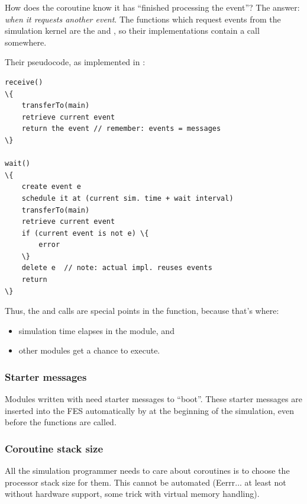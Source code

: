 How does the coroutine know it has ``finished processing the event''?
The answer: \textit{when it requests another event}.  The functions
which request events from the simulation kernel are the
 and , so their
implementations contain a  call
somewhere.


Their pseudocode, as implemented in {\opp}:


\begin{Verbatim}[commandchars=\\\{\}]
receive()
\{
    transferTo(main)
    retrieve current event
    return the event // remember: events = messages
\}

wait()
\{
    create event e
    schedule it at (current sim. time + wait interval)
    transferTo(main)
    retrieve current event
    if (current event is not e) \{
        error
    \}
    delete e  // note: actual impl. reuses events
    return
\}
\end{Verbatim}



Thus, the  and  calls are
special points in the  function, because that's
where:

\begin{itemize}
  \item{simulation time elapses in the module, and}
  \item{other modules get a chance to execute.}
\end{itemize}


\subsubsection{Starter messages}


Modules written with  need starter
messages to ``boot''.  These starter messages
are inserted into the FES automatically by {\opp} at the
beginning of the simulation, even before the 
functions are called.


\subsubsection{Coroutine stack size}


All the simulation programmer needs to care about coroutines is to
choose the processor stack size for them.
This cannot be automated (Eerrr... at least not without hardware
support, some trick with virtual memory handling).

